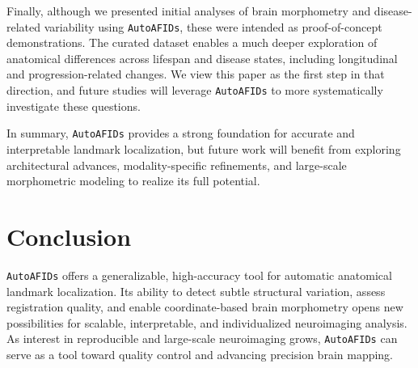 Finally, although we presented initial analyses of brain morphometry and disease-related variability using \texttt{AutoAFIDs}, these were intended as proof-of-concept demonstrations. The curated dataset enables a much deeper exploration of anatomical differences across lifespan and disease states, including longitudinal and progression-related changes. We view this paper as the first step in that direction, and future studies will leverage \texttt{AutoAFIDs} to more systematically investigate these questions.

In summary, \texttt{AutoAFIDs} provides a strong foundation for accurate and interpretable landmark localization, but future work will benefit from exploring architectural advances, modality-specific refinements, and large-scale morphometric modeling to realize its full potential.

\section{Conclusion}

\texttt{AutoAFIDs} offers a generalizable, high-accuracy tool for automatic anatomical landmark localization. Its ability to detect subtle structural variation, assess registration quality, and enable coordinate-based brain morphometry opens new possibilities for scalable, interpretable, and individualized neuroimaging analysis. As interest in reproducible and large-scale neuroimaging grows, \texttt{AutoAFIDs} can serve as a tool toward quality control and advancing precision brain mapping.



